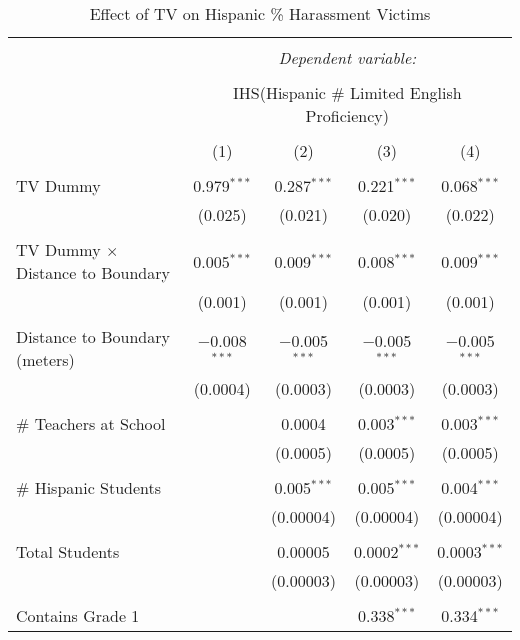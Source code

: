 
\begin{table}[!htbp] \centering 
  \caption{Effect of TV on Hispanic \% Harassment Victims} 
  \label{} 
\begin{tabular}{@{\extracolsep{-2pt}}lcccc} 
\\[-1.8ex]\hline 
\hline \\[-1.8ex] 
 & \multicolumn{4}{c}{\textit{Dependent variable:}} \\ 
\cline{2-5} 
\\[-1.8ex] & \multicolumn{4}{c}{IHS(Hispanic \# Limited English Proficiency)} \\ 
\\[-1.8ex] & (1) & (2) & (3) & (4)\\ 
\hline \\[-1.8ex] 
 TV Dummy & 0.979$^{***}$ & 0.287$^{***}$ & 0.221$^{***}$ & 0.068$^{***}$ \\ 
  & (0.025) & (0.021) & (0.020) & (0.022) \\ 
  & & & & \\ 
 TV Dummy $\times$ Distance to Boundary & 0.005$^{***}$ & 0.009$^{***}$ & 0.008$^{***}$ & 0.009$^{***}$ \\ 
  & (0.001) & (0.001) & (0.001) & (0.001) \\ 
  & & & & \\ 
 Distance to Boundary (meters) & $-$0.008$^{***}$ & $-$0.005$^{***}$ & $-$0.005$^{***}$ & $-$0.005$^{***}$ \\ 
  & (0.0004) & (0.0003) & (0.0003) & (0.0003) \\ 
  & & & & \\ 
 \# Teachers at School &  & 0.0004 & 0.003$^{***}$ & 0.003$^{***}$ \\ 
  &  & (0.0005) & (0.0005) & (0.0005) \\ 
  & & & & \\ 
 \# Hispanic Students &  & 0.005$^{***}$ & 0.005$^{***}$ & 0.004$^{***}$ \\ 
  &  & (0.00004) & (0.00004) & (0.00004) \\ 
  & & & & \\ 
 Total Students &  & 0.00005 & 0.0002$^{***}$ & 0.0003$^{***}$ \\ 
  &  & (0.00003) & (0.00003) & (0.00003) \\ 
  & & & & \\ 
 Contains Grade 1 &  &  & 0.338$^{***}$ & 0.334$^{***}$ \\ 

\end{tabular}
\end{table}

